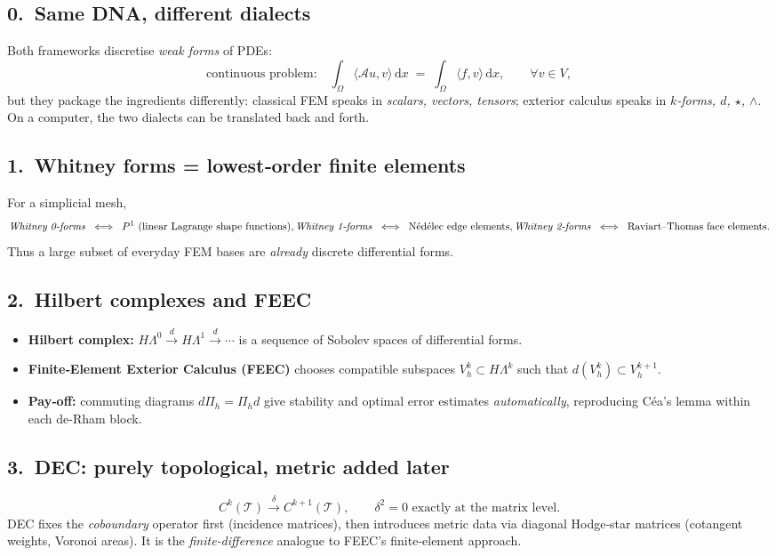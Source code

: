 \documentclass[12pt]{article}
\theoremstyle{definition} %
\theoremstyle{plain} %
\begin{document}
\subsection*{0.\  Same DNA, different dialects}
Both frameworks discretise \emph{weak forms} of PDEs:
\[
  \text{continuous problem:}\quad
  \int_\Omega \!\langle \mathcal{A}u , v \rangle \, \mathrm{d}x
  \;=\; \int_\Omega \!\langle f , v\rangle \, \mathrm{d}x ,
  \qquad \forall v\in V,
\]
but they package the ingredients differently:  
classical FEM speaks in \emph{scalars, vectors, tensors};  
exterior calculus speaks in \emph{$k$‑forms, $d$, $\star$, $\wedge$}.  
On a computer, the two dialects can be translated back and forth.

\subsection*{1.\  Whitney forms = lowest‑order finite elements}
For a simplicial mesh,
\[
  \text{\emph{Whitney~0‑forms}} \;\;\Longleftrightarrow\;\; P^1
  \text{ (linear Lagrange shape functions)},\\
  \text{\emph{Whitney~1‑forms}} \;\;\Longleftrightarrow\;\;
     \text{Nédélec edge elements},\\
  \text{\emph{Whitney~2‑forms}} \;\;\Longleftrightarrow\;\;
     \text{Raviart–Thomas face elements}.
\]
Thus a large subset of everyday FEM bases are \emph{already}
discrete differential forms.

\subsection*{2.\  Hilbert complexes and FEEC}
\begin{itemize}
  \item \textbf{Hilbert complex:}\;
        \( H\Lambda^0 \xrightarrow{d} H\Lambda^1 \xrightarrow{d}
        \cdots \) is a sequence of Sobolev spaces of differential forms.
  \item \textbf{Finite‑Element Exterior Calculus (FEEC)} chooses
        compatible subspaces
        \( V_h^k \subset H\Lambda^k \) such that
        \( d(V_h^k) \subset V_h^{k+1} \).
  \item \textbf{Pay‑off:}\; commuting diagrams $d\Pi_h = \Pi_h d$
        give stability and optimal error estimates \emph{automatically},
        reproducing Céa's lemma within each de-Rham block.
\end{itemize}

\subsection*{3.\  DEC: purely topological, metric added later}
\[
  C^k(\mathcal{T}) \xrightarrow{\;\delta\;} C^{k+1}(\mathcal{T}),
  \qquad \delta^2 = 0 \text{ exactly at the matrix level.}
\]
DEC fixes the \emph{coboundary} operator first (incidence matrices),
then introduces metric data via diagonal Hodge‑star matrices
(cotangent weights, Voronoi areas).  
It is the \emph{finite‑difference} analogue to FEEC’s finite‑element
approach.
\end{document}
